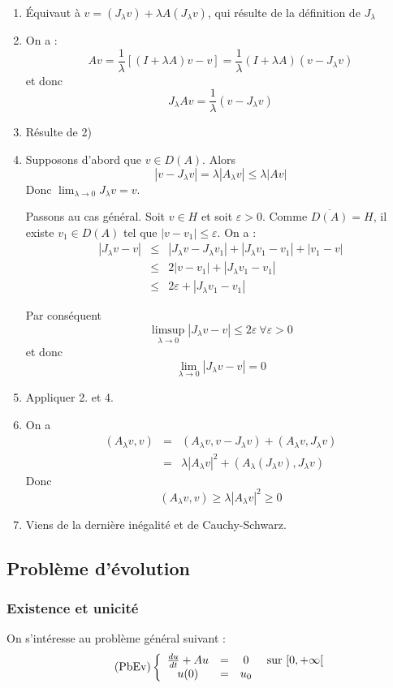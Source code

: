 \begin{dem}\begin{enumerate}
	\item Équivaut à $v=(J_\lambda v)+\lambda A(J_\lambda v)$, qui résulte de la définition de $J_\lambda$
	\item On a : \[Av=\frac{1}{\lambda} [(I+\lambda A)v-v]=\frac{1}{\lambda}(I+\lambda A)(v-J_\lambda v)\]
et donc \[J_\lambda Av=\frac{1}{\lambda}(v-J_\lambda v)\]
	\item Résulte de 2)
	\item Supposons d'abord que $v\in D(A)$. Alors \[|v-J_\lambda v|=\lambda|A_\lambda v|\leq \lambda|Av|\]
Donc $\lim_{\lambda\to 0} J_\lambda v=v$.

\bigskip
Passons au cas général. Soit $v\in H$ et soit $\varepsilon>0$. Comme $\overline{D(A)}=H$, il existe $v_1\in D(A)$ tel que $|v-v_1|\leq\varepsilon$. On a : 
\begin{eqnarray*}
|J_\lambda v-v|&\leq& |J_\lambda v-J_\lambda v_1|+|J_\lambda v_1-v_1|+|v_1-v|\\
		&\leq& 2|v-v_1|+|J_\lambda v_1-v_1|\\
		&\leq& 2\varepsilon + |J_\lambda v_1-v_1|
\end{eqnarray*}

Par conséquent \[\limsup_{\lambda\to 0} |J_\lambda v-v|\leq 2\varepsilon\ \forall\varepsilon>0\]
et donc \[\lim_{\lambda\to 0} |J_\lambda v-v|=0\]

	\item Appliquer 2. et 4.
	\item On a \begin{eqnarray*}
(A_\lambda v,v)&=&(A_\lambda v,v-J_\lambda v)+(A_\lambda v,J_\lambda v)\\
		&=&\lambda|A_\lambda v|^2+(A_\lambda(J_\lambda v),J_\lambda v)
\end{eqnarray*}
Donc \[(A_\lambda v,v)\geq \lambda|A_\lambda v|^2\geq 0\]

	\item Viens de la dernière inégalité et de Cauchy-Schwarz.
\end{enumerate}\end{dem}

\subsection{Problème d'évolution}
\subsubsection{Existence et unicité}
On s'intéresse au problème général suivant :
\begin{equation} \label{PbEv} \tag{PbEv} \left\{ \begin{array}{c c c c}
	\frac{du}{dt}+Au &=& 0 &\text{ sur } [0,+\infty[\\
	u(0)&=&u_0
\end{array}\right. \end{equation}

